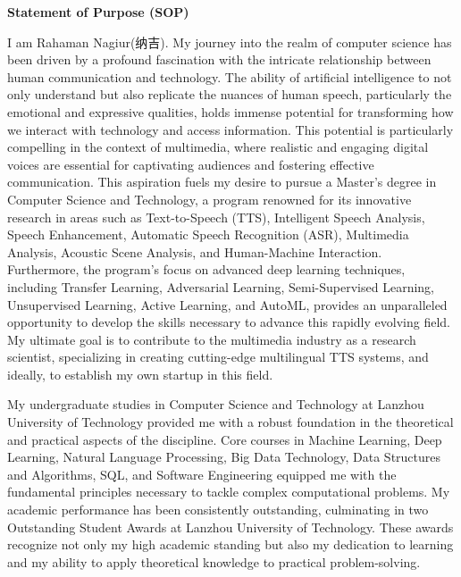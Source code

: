 \documentclass[12pt,a4paper]{article}
\begin{document}
\begin{CJK*}{UTF8}{gbsn}
    \thispagestyle{plain}



\begin{center}

    \Huge{ \bfseries{ Statement of Purpose (SOP)}}


    \vspace*{0.2cm}


    
\end{center}


I am Rahaman Nagiur(纳吉). My journey into the realm of computer science has been driven by a profound fascination with the intricate relationship between human communication and technology. The ability of artificial intelligence to not only understand but also replicate the nuances of human speech, particularly the emotional and expressive qualities, holds immense potential for transforming how we interact with technology and access information. This potential is particularly compelling in the context of multimedia, where realistic and engaging digital voices are essential for captivating audiences and fostering effective communication. This aspiration fuels my desire to pursue a Master's degree in Computer Science and Technology, a program renowned for its innovative research in areas such as Text-to-Speech (TTS), Intelligent Speech Analysis, Speech Enhancement, Automatic Speech Recognition (ASR), Multimedia Analysis, Acoustic Scene Analysis, and Human-Machine Interaction. Furthermore, the program's focus on advanced deep learning techniques, including Transfer Learning, Adversarial Learning, Semi-Supervised Learning, Unsupervised Learning, Active Learning, and AutoML, provides an unparalleled opportunity to develop the skills necessary to advance this rapidly evolving field. My ultimate goal is to contribute to the multimedia industry as a research scientist, specializing in creating cutting-edge multilingual TTS systems, and ideally, to establish my own startup in this field.\newline

My undergraduate studies in Computer Science and Technology at Lanzhou University of Technology provided me with a robust foundation in the theoretical and practical aspects of the discipline. Core courses in Machine Learning, Deep Learning, Natural Language Processing, Big Data Technology, Data Structures and Algorithms, SQL, and Software Engineering equipped me with the fundamental principles necessary to tackle complex computational problems. My academic performance has been consistently outstanding, culminating in two Outstanding Student Awards at Lanzhou University of Technology. These awards recognize not only my high academic standing but also my dedication to learning and my ability to apply theoretical knowledge to practical problem-solving.\newline


\end{CJK*}
\end{document}
